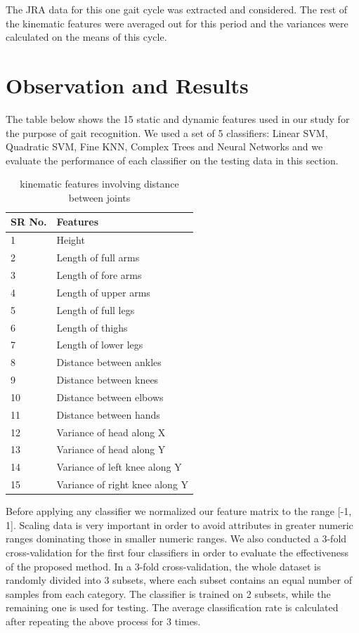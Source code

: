 \noindent The JRA data for this one gait cycle was extracted and considered. The rest of the kinematic features were averaged out for this period and the variances were calculated on the means of this cycle.\\
\newpage

\section{Observation and Results} \label{Observation and Results}  
\noindent The table below shows the 15 static and dynamic features used in our study for the purpose of gait recognition. We used a set of 5 classifiers: Linear SVM, Quadratic SVM, Fine KNN, Complex Trees and Neural Networks and we evaluate the performance of each classifier on the testing data in this section.
 

\def\arraystretch{1.28}
\begin{table}[h]
\centering
\begin{tabular}{| p{2cm} | |p{6cm}|}
 \hline
\cellcolor{pink} SR No. & \cellcolor{pink} Features  \\ \hline
1 & Height \\ \hline
2 & Length of full arms \\ \hline
3 & Length of fore arms \\\hline
4 & Length of upper arms \\ \hline
5 & Length of full legs \\ \hline
6 & Length of thighs \\\hline
7 & Length of lower legs \\\hline
8 & Distance between ankles  \\ \hline
9 & Distance between knees \\ \hline
10 & Distance between elbows  \\ \hline
11 & Distance between hands  \\ \hline
12 & Variance of head along X   \\ \hline
13 & Variance of head along Y  \\ \hline
14 & Variance of left knee along Y  \\ \hline
15 & Variance of right knee along Y  \\ \hline
\end{tabular}
\caption{ kinematic features involving distance between joints}
\end{table}


\noindent Before applying any classifier we normalized our feature matrix to the range [-1, 1]. Scaling data is very important in order to avoid attributes in greater numeric ranges dominating those in smaller numeric ranges. We also conducted a 3-fold cross-validation for the first four classifiers in order to evaluate the effectiveness of the proposed method. In a 3-fold cross-validation, the whole dataset is randomly divided into 3 subsets, where each subset contains an equal number of samples from each category. The classifier is trained on 2 subsets, while the remaining one is used for testing. The average classification rate is calculated after repeating the above process for 3 times.\\

